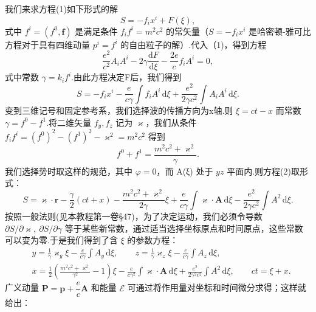 \begin{xiti}
我们来求方程(1)如下形式的解
\begin{equation*}
  S=-f_ix^i+F(\xi),
\end{equation*}
式中 $f^i = (f^0,\boldsymbol{f})$ 是满足条件 $f_if^i = m^2c^2$ 的常矢量（$S = -f_ix^i$ 是哈密顿-雅可比方程对于具有四维动量 $p^i = f^i$ 的自由粒子的解）.代入（1)，得到方程
\begin{equation*}
  \frac{e^2}{c^2}A_iA^i-2\gamma\frac{\mathrm{d}F}{\mathrm{d}\xi}
  -\frac{2e}{c}f_iA^i=0,
\end{equation*}
式中常数 $\gamma = k_if^i$.由此方程决定F后，我们得到
\begin{equation}\tag{2}
  S=-f_ix^i-\frac{e}{c\gamma}\int f_iA^i\,\mathrm{d}\xi
  +\frac{e^2}{2\gamma c^2}\int A_iA^i\,\mathrm{d}\xi.
\end{equation}
变到三维记号和固定参考系，我们选择波的传播方向为x轴.则 $\xi = ct - x$ 而常数 $\gamma = f^0 - f^1$.将二维矢量 $f_y,f_z$ 记为 $\varkappa$，我们从条件
$f_if^i = (f^0)^2-(f^1)^2-\varkappa^2 = m^2c^2$ 得到
\begin{equation*}
  f^0+f^1=\frac{m^2c^2+\varkappa^2}{\gamma}.
\end{equation*}
我们选择势时取这样的规范，其中 $\varphi = 0$，而 A(ξ) 处于 $yz$ 平面内.则方程(2)取形式：
\begin{equation*}
  S=\boldsymbol{\varkappa}\cdot\boldsymbol{r}-\frac{\gamma}{2}(ct+x)
  -\frac{m^2c^2+\varkappa^2}{2\gamma}\xi
  +\frac{e}{c\gamma}\int\boldsymbol{\varkappa}\cdot\boldsymbol{A}\,\mathrm{d}\xi
  -\frac{e^2}{2\gamma c^2}\int A^2\,\mathrm{d}\xi.
\end{equation*}
按照一般法则(见本教程第一卷§47)，为了决定运动，我们必须令导数
$\partial S/\partial\varkappa,\ \partial S/\partial\gamma$ 等于某些新常数，通过适当选择坐标原点和时间原点，这些常数可以变为零.于是我们得到了含 $\xi$ 的参数方程：
\begin{equation*}
\begin{aligned}
  &y=\frac{1}{\gamma}\varkappa_y\xi-\frac{e}{c\gamma}\int A_y\,\mathrm{d}\xi,\qquad
  z=\frac{1}{\gamma}\varkappa_z\xi-\frac{e}{c\gamma}\int A_z\,\mathrm{d}\xi,\\
  &x=\frac{1}{2}\left(\frac{m^2c^2+\varkappa^2}{\gamma^2}-1\right)\xi
  -\frac{e}{c\gamma^2}\int\boldsymbol{\varkappa}\cdot\boldsymbol{A}\,\mathrm{d}\xi
  +\frac{e^2}{2\gamma^2c^2}\int A^2\,\mathrm{d}\xi,\qquad
  ct=\xi+x.
\end{aligned}
\end{equation*}
广义动量 $\boldsymbol{P}=\boldsymbol{p}+\dfrac{e}{c}\boldsymbol{A}$ 和能量 $\mathcal{E}$ 可通过将作用量对坐标和时间微分求得；这样就给出：

\end{xiti}

